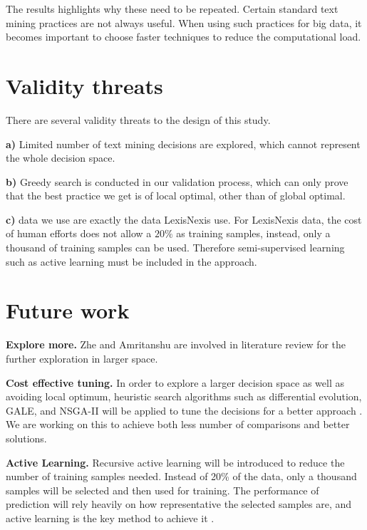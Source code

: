 \documentclass{sig-alternate-05-2015}
\begin{document}
The results highlights why these need to be repeated. Certain standard text mining practices are not always useful. When using such practices for big data, it becomes important to choose faster techniques to reduce the computational load. 

\section{Validity threats}

There are several validity threats to the design of this study. 

\textbf{a)} Limited number of text mining decisions are explored, which cannot represent the whole decision space. 

\textbf{b)} Greedy search is conducted in our validation process, which can only prove that the best practice we get is of local optimal, other than of global optimal. 

\textbf{c)} data we use are exactly the data LexisNexis use. For LexisNexis data, the cost of human efforts does not allow a $20\%$ as  training samples, instead, only a thousand of training samples can be used. Therefore semi-supervised learning such as active learning must be included in the approach.


\section{Future work}


\textbf{Explore more.} Zhe and Amritanshu are involved in literature review for the further exploration in larger space.

\textbf{Cost effective tuning.} In order to explore a larger decision space as well as avoiding local optimum, heuristic search algorithms such as differential evolution, GALE, and NSGA-II will be applied to tune the decisions for a better approach \cite{storn1997differential,krall2015gale,deb2002fast}. We are working on this to achieve both less number of comparisons and better solutions.

\textbf{Active Learning.} Recursive active learning will be introduced to reduce the number of training samples needed. Instead of 20\% of the data, only a thousand samples will be selected and then used for training. The performance of prediction will rely heavily on how representative the selected samples are, and active learning is the key method to achieve it \cite{tong2002support}.
\end{document}
